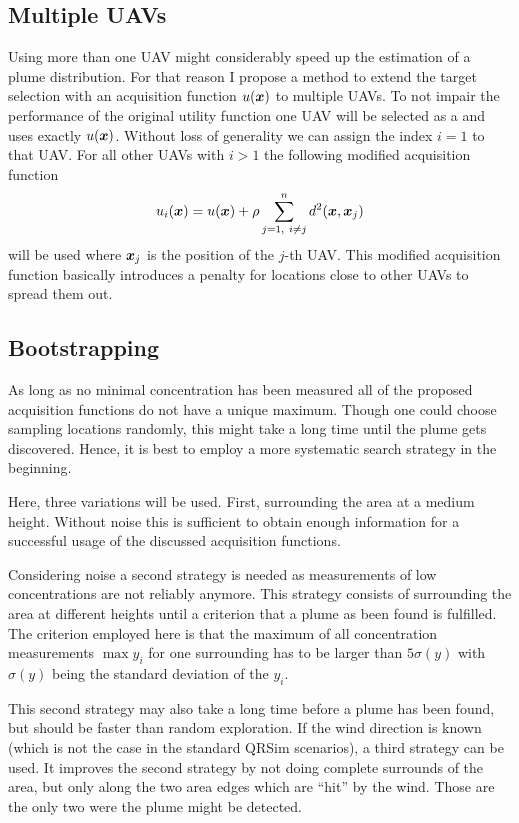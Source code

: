 \subsection{Multiple UAVs}\label{sec:multiple-uavs}
Using more than one UAV might considerably speed up the estimation of a plume 
distribution. For that reason I propose a method to extend the target selection 
with an acquisition function $u(\bm{x})$ to multiple UAVs. To not impair the 
performance of the original utility function one UAV will be selected as 
a  and uses exactly $u(\bm{x})$. Without loss of generality 
we can assign the index $i = 1$ to that UAV\@. For all other UAVs with $i > 1$ 
the following modified acquisition function
\begin{equation}
    u_i(\bm{x}) = u(\bm{x}) + \rho \sum_{j = 1,\ i \neq j}^n d^2(\bm{x}, \bm{x}_j)
\end{equation}
will be used where $\bm{x}_j$ is the position of the $j$-th UAV\@. This modified 
acquisition function basically introduces a penalty for locations close to other 
UAVs to spread them out.

\subsection{Bootstrapping}\label{sec:bootstrapping}
As long as no minimal concentration has been measured all of the proposed 
acquisition functions do not have a unique maximum. Though one could choose 
sampling locations randomly, this might take a long time until the plume gets 
discovered.  Hence, it is best to employ a more systematic search strategy in 
the beginning.

Here, three variations will be used. First, surrounding the area at a medium 
height.  Without noise this is sufficient to obtain enough information for 
a successful usage of the discussed acquisition functions.

Considering noise a second strategy is needed as measurements of low 
concentrations are not reliably anymore. This strategy consists of surrounding 
the area at different heights until a criterion that a plume as been found is 
fulfilled. The criterion employed here is that the maximum of all concentration 
measurements $\max y_i$ for one surrounding has to be larger than $5\sigma(y)$ 
with $\sigma(y)$ being the standard deviation of the $y_i$.

This second strategy may also take a long time before a plume has been found, 
but should be faster than random exploration. If the wind direction is known 
(which is not the case in the standard QRSim scenarios), a third strategy can be 
used.  It improves the second strategy by not doing complete surrounds of the 
area, but only along the two area edges which are ``hit'' by the wind. Those are 
the only two were the plume might be detected.

